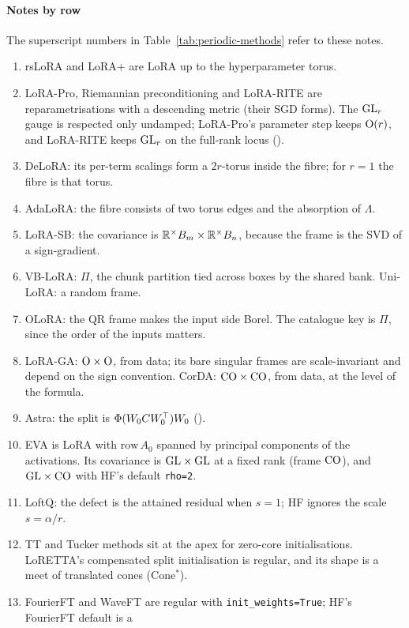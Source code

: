\paragraph{Notes by row}
The superscript numbers in Table~\ref{tab:periodic-methods} refer to these notes.
{\small
\begin{enumerate}[label={\sffamily\bfseries\color{tide}\arabic*},leftmargin=1.6em,itemsep=1pt,topsep=3pt]
  \item rsLoRA and LoRA+ are LoRA up to the hyperparameter torus.
  \item LoRA-Pro, Riemannian preconditioning and LoRA-RITE are reparametrisations with a descending metric (their SGD
  forms). The $\mathrm{GL}_r$ gauge is respected only undamped; LoRA-Pro's parameter step keeps $\mathrm{O}(r)$, and LoRA-RITE keeps
  $\mathrm{GL}_r$ on the full-rank locus ().
  \item DeLoRA: its per-term scalings form a $2r$-torus inside the fibre; for $r=1$ the fibre is that torus.
  \item AdaLoRA: the fibre consists of two torus edges and the absorption of $\Lambda$.
  \item LoRA-SB: the covariance is $\mathbb{R}^\times B_m\times\mathbb{R}^\times B_n$, because the frame is the SVD of a sign-gradient.
  \item VB-LoRA: $\Pi$, the chunk partition tied across boxes by the shared bank. Uni-LoRA: a random frame.
  \item OLoRA: the QR frame makes the input side Borel. The catalogue key is $\Pi$, since the order of the inputs
  matters.
  \item LoRA-GA: $\mathrm{O}\times\mathrm{O}$, from data; its bare singular frames are scale-invariant and depend on the sign
  convention. CorDA: $\mathrm{CO}\times\mathrm{CO}$, from data, at the level of the formula.
  \item Astra: the split is $\Phi(W_0CW_0^{\top})W_0$ ().
  \item EVA is LoRA with $\mathrm{row}\,A_0$ spanned by principal components of the activations. Its covariance is
  $\mathrm{GL}\times\mathrm{GL}$ at a fixed rank (frame $\mathrm{CO}$), and $\mathrm{GL}\times\mathrm{CO}$ with HF's default \texttt{rho=2}.
  \item LoftQ: the defect is the attained residual when $s=1$; HF ignores the scale $s=\alpha/r$.
  \item TT and Tucker methods sit at the apex for zero-core initialisations. LoRETTA's compensated split initialisation
  is regular, and its shape is a meet of translated cones (Cone$^*$).
  \item FourierFT and WaveFT are regular with \texttt{init\_\allowbreak weights=True}; HF's FourierFT default is a

\end{enumerate}}
